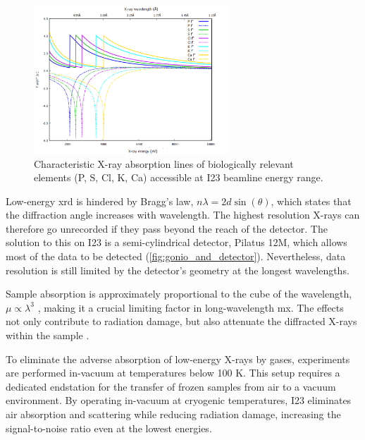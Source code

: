 \begin{figure}[h]
    \centering
    \includegraphics[width = 0.65\textwidth]{images/absorption lines high quality cropped.png}
    \caption{Characteristic X-ray absorption lines of biologically relevant elements (P, S, Cl, K, Ca) accessible at I23 beamline energy range.}%
    \label{Anomaluos scattering edges}
\end{figure}

Low-energy \ac{xrd} is hindered by Bragg’s law, $nλ = 2d \sin(\theta)$, which states that the diffraction angle increases with wavelength. The highest resolution X-rays can therefore go unrecorded if they pass beyond the reach of the detector. The solution to this on I23 is a semi-cylindrical detector, Pilatus 12M, which allows most of the data to be detected (\cref{fig:gonio_and_detector}). Nevertheless, data resolution is still limited by the detector’s geometry at the longest wavelengths.

 Sample absorption is approximately proportional to the cube of the wavelength, $\mu \propto \lambda^3$ \cite{Arndt1984}, making it a crucial limiting factor in long-wavelength \ac{mx}. The effects not only contribute to radiation damage, but also attenuate the diffracted X-rays within the sample \cite{Wagner2016}.

To eliminate the adverse absorption of low-energy X-rays by gases, experiments are performed in-vacuum at temperatures below 100 K. This setup requires a dedicated endstation for the transfer of frozen samples from air to a vacuum environment. By operating in-vacuum at cryogenic temperatures, I23 eliminates air absorption and scattering while reducing radiation damage, increasing the signal-to-noise ratio even at the lowest energies.

